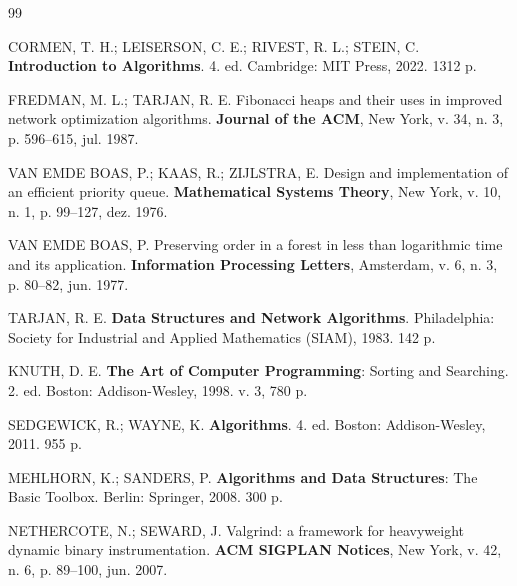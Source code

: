 \documentclass[12pt,a4paper]{report}
\begin{document}
\begin{thebibliography}{99}
\small

CORMEN, T. H.; LEISERSON, C. E.; RIVEST, R. L.; STEIN, C. \textbf{Introduction to Algorithms}. 4. ed. Cambridge: MIT Press, 2022. 1312 p.

FREDMAN, M. L.; TARJAN, R. E. Fibonacci heaps and their uses in improved network optimization algorithms. \textbf{Journal of the ACM}, New York, v. 34, n. 3, p. 596--615, jul. 1987.

VAN EMDE BOAS, P.; KAAS, R.; ZIJLSTRA, E. Design and implementation of an efficient priority queue. \textbf{Mathematical Systems Theory}, New York, v. 10, n. 1, p. 99--127, dez. 1976.

VAN EMDE BOAS, P. Preserving order in a forest in less than logarithmic time and its application. \textbf{Information Processing Letters}, Amsterdam, v. 6, n. 3, p. 80--82, jun. 1977.

TARJAN, R. E. \textbf{Data Structures and Network Algorithms}. Philadelphia: Society for Industrial and Applied Mathematics (SIAM), 1983. 142 p.

KNUTH, D. E. \textbf{The Art of Computer Programming}: Sorting and Searching. 2. ed. Boston: Addison-Wesley, 1998. v. 3, 780 p.

SEDGEWICK, R.; WAYNE, K. \textbf{Algorithms}. 4. ed. Boston: Addison-Wesley, 2011. 955 p.

MEHLHORN, K.; SANDERS, P. \textbf{Algorithms and Data Structures}: The Basic Toolbox. Berlin: Springer, 2008. 300 p.

NETHERCOTE, N.; SEWARD, J. Valgrind: a framework for heavyweight dynamic binary instrumentation. \textbf{ACM SIGPLAN Notices}, New York, v. 42, n. 6, p. 89--100, jun. 2007.

\end{thebibliography}
\end{document}
